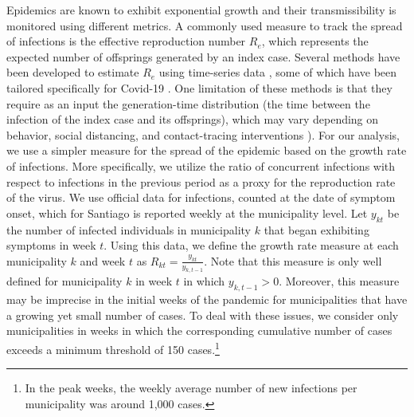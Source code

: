 Epidemics are known to exhibit exponential growth and their transmissibility is monitored using different metrics. A commonly used measure to track the spread of infections is the effective reproduction number $R_e$, which represents the expected number of offsprings generated by an index case. Several methods have been developed to estimate $R_e$ using time-series data \citep{cori2013new,wallinga2004different}, some of which have been tailored specifically for Covid-19 \citep{bandt2020reproduction}. One limitation of these methods is that they require as an input the generation-time distribution (the time between the infection of the index case and its offsprings), which may vary depending on behavior, social distancing, and contact-tracing interventions \citep{gostic2020practical}). For our analysis, we use a simpler measure for the spread of the epidemic based on the growth rate of infections. More specifically, we utilize the ratio of concurrent infections with respect to infections in the previous period as a proxy for the reproduction rate of the virus. We use official data for infections, counted at the date of symptom onset, which for Santiago is reported weekly at the municipality level.  Let $y_{kt}$ be the number of infected individuals in municipality $k$ that began exhibiting symptoms in week $t$. Using this data, we define the growth rate measure at each municipality $k$ and week $t$ as $ R_{kt}=\frac{y_{kt}}{y_{k,t-1}}$. Note that this measure is only well defined for municipality $k$ in week $t$ in which $y_{k,t-1}>0$. Moreover, this measure may be imprecise in the initial weeks of the pandemic for municipalities that have a growing yet small number of cases. To deal with these issues, we consider only municipalities in weeks in which the corresponding cumulative number of cases exceeds a minimum threshold of 150 cases.\footnote{In the peak weeks, the weekly average number of new infections per municipality was around 1,000 cases.}

